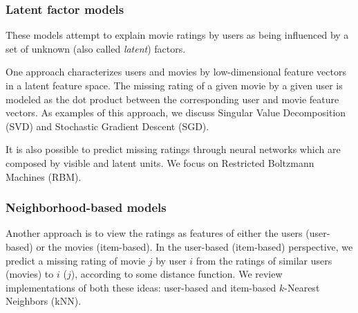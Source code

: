 \documentclass[10pt,conference,compsocconf]{IEEEtran}
\begin{document}
	\subsubsection*{\textbf{Latent factor models}} 
	
	
	These models attempt to explain movie ratings by users as being influenced by a set of unknown (also called \emph{latent}) factors.
	
	One approach characterizes users and movies by low-dimensional feature vectors in a latent feature space. The missing rating of a given movie by a given user is modeled as the dot product between the corresponding user and movie feature vectors. As  examples of this approach, we discuss Singular Value Decomposition (SVD) and Stochastic Gradient Descent (SGD).
	
	It is also possible to predict missing ratings through neural networks which are composed by visible and latent units. We focus on Restricted Boltzmann Machines (RBM).
	
	
	\subsubsection*{\textbf{Neighborhood-based models}} 
	Another approach is to view the ratings as features of either the users (user-based) or the movies (item-based). In the user-based (item-based) perspective, we predict a missing rating of movie $j$ by user $i$ from the ratings of similar users (movies) to $i$ ($j$), according to some distance function. We review implementations of both these ideas: user-based and item-based $k$-Nearest Neighbors (kNN).
	
	
\end{document}

